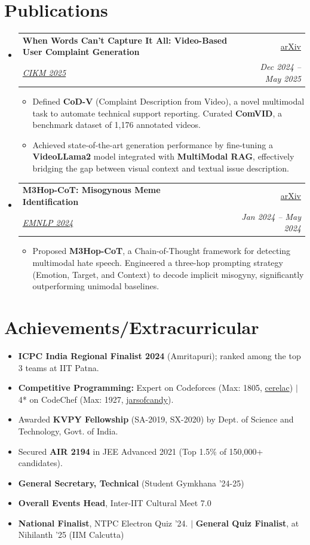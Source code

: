 \documentclass[letterpaper,11pt]{article}
\makeatletter
\newcommand{\resumeItem}[1]{
  \item\small{
    {#1 \vspace{-2pt}}
  }
}
\newcommand{\resumeProjectHeading}[4]{
    \item
    \begin{tabular*}{0.97\textwidth}{l@{\extracolsep{\fill}}r}
      \small#1 & #2 \\
      \textit{\small#3} & \textit{\small #4} \\
    \end{tabular*}\vspace{-7pt}
}
\newcommand{\resumeSubHeadingListStart}{\begin{itemize}[leftmargin=0.15in, label={\raisebox{0.2\height}{\tiny$\bullet$}}, itemsep=0pt, topsep=0pt]}
\newcommand{\resumeSubHeadingListEnd}{\end{itemize}}
\newcommand{\resumeItemListStart}{\begin{itemize}[itemsep=0pt, topsep=1pt]}
\newcommand{\resumeItemListEnd}{\end{itemize}\vspace{-5pt}}
\makeatother
\begin{document}
\section{Publications}
\resumeSubHeadingListStart

    \resumeProjectHeading
  {\textbf{When Words Can’t Capture It All: Video-Based User Complaint Generation}}{\href{https://arxiv.org/abs/2509.19952}{arXiv}}
  {\textit{\href{https://cikm2025.org/}{CIKM 2025}}} {Dec 2024 -- May 2025}
  \resumeItemListStart
      \resumeItem{Defined \textbf{CoD-V} (Complaint Description from Video), a novel multimodal task to automate technical support reporting. Curated \textbf{ComVID}, a benchmark dataset of 1,176 annotated videos.}
      \resumeItem{Achieved state-of-the-art generation performance by fine-tuning a \textbf{VideoLLama2} model integrated with \textbf{MultiModal RAG}, effectively bridging the gap between visual context and textual issue description.}
  \resumeItemListEnd

    \resumeProjectHeading
          {\textbf{M3Hop-CoT: Misogynous Meme Identification}}{\href{https://arxiv.org/abs/2410.09220}{arXiv}}
          {\textit{\href{https://2024.emnlp.org/program/accepted_main_conference/}{EMNLP 2024}}} {Jan 2024 -- May 2024}
          \resumeItemListStart
\resumeItem{Proposed \textbf{M3Hop-CoT}, a Chain-of-Thought framework for detecting multimodal hate speech. Engineered a three-hop prompting strategy (Emotion, Target, and Context) to decode implicit misogyny, significantly outperforming unimodal baselines.}
          \resumeItemListEnd

\resumeSubHeadingListEnd

\section{Achievements/Extracurricular}
  \resumeSubHeadingListStart
    \resumeItem{\textbf{ICPC India Regional Finalist 2024} (Amritapuri); ranked among the top 3 teams at IIT Patna.}
    \resumeItem{\textbf{Competitive Programming:} Expert on Codeforces (Max: 1805, \href{https://codeforces.com/profile/cerelac}{cerelac}) $|$ 4* on CodeChef (Max: 1927, \href{https://www.codechef.com/users/jarsofcandy}{jarsofcandy}).}
    \resumeItem{Awarded \textbf{KVPY Fellowship} (SA-2019, SX-2020) by Dept. of Science and Technology, Govt. of India.}
    \resumeItem{Secured \textbf{AIR 2194} in JEE Advanced 2021 (Top 1.5\% of 150,000+ candidates).}
    \resumeItem{\textbf{General Secretary, Technical} (Student Gymkhana '24-25)}
    \resumeItem{\textbf{Overall Events Head}, Inter-IIT Cultural Meet 7.0}
    \resumeItem{\textbf{National Finalist}, NTPC Electron Quiz '24. $|$ \textbf{General Quiz Finalist}, at Nihilanth '25 (IIM Calcutta)}
  \resumeSubHeadingListEnd
\end{document}
